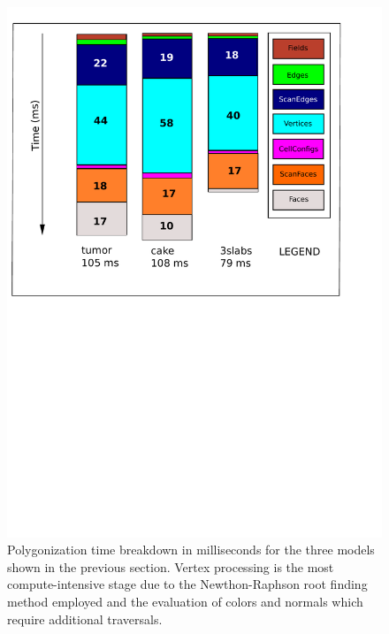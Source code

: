 
\begin{figure}[H]
  \centering
  \includegraphics[width=1.0\linewidth]{figures/gpupoly/breakdownpoly.pdf}
  \caption{\label{fig:breakdownpoly}
  {Polygonization time breakdown in milliseconds for the three models shown in the previous section. Vertex processing is the most compute-intensive
  stage due to the Newthon-Raphson root finding method employed and the evaluation of colors and normals which require additional traversals.
  }
}
\end{figure}

